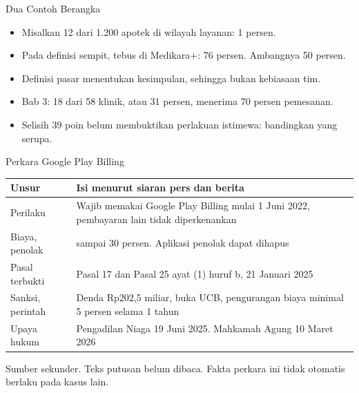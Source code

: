 \documentclass[aspectratio=169, table, 12pt]{beamer}
\begin{document}
\begin{frame}{{\Large Dua Contoh Berangka}}
  \vspace{8pt}
  \begin{itemize}
    \item Misalkan 12 dari 1.200 apotek di wilayah layanan: 1 persen.
    \item Pada definisi sempit, tebus di Medikara+: 76 persen. Ambangnya 50 persen.
    \item Definisi pasar menentukan kesimpulan, sehingga bukan kebiasaan tim.
    \item Bab 3: 18 dari 58 klinik, atau 31 persen, menerima 70 persen pemesanan.
    \item Selisih 39 poin belum membuktikan perlakuan istimewa: bandingkan yang serupa.
  \end{itemize}
\end{frame}

\begin{frame}{{\Large Perkara Google Play Billing}}
  \footnotesize
  \begin{tabularx}{\textwidth}{>{\raggedright\arraybackslash}p{2.7cm} >{\raggedright\arraybackslash}X}
    \hline
    \textbf{Unsur} & \textbf{Isi menurut siaran pers dan berita} \\ \hline
    Perilaku & Wajib memakai Google Play Billing mulai 1 Juni 2022, pembayaran lain tidak diperkenankan \\ \hline
    Biaya, penolak & 15 sampai 30 persen. Aplikasi penolak dapat dihapus \\ \hline
    Pasal terbukti & Pasal 17 dan Pasal 25 ayat (1) huruf b, 21 Januari 2025 \\ \hline
    Sanksi, perintah & Denda Rp202,5 miliar, buka UCB, pengurangan biaya minimal 5 persen selama 1 tahun \\ \hline
    Upaya hukum & Pengadilan Niaga 19 Juni 2025. Mahkamah Agung 10 Maret 2026 \\ \hline
  \end{tabularx}

  \vspace{6pt}
  \small Sumber sekunder. Teks putusan belum dibaca. Fakta perkara ini tidak otomatis berlaku pada kasus lain.
\end{frame}
\end{document}
